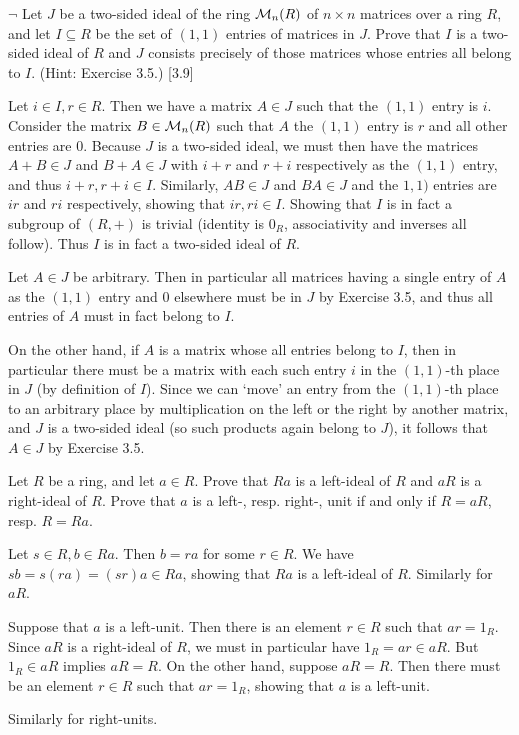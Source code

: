 \begin{problem}
	$\neg$ Let $J$ be a two-sided ideal of the ring $\mathcal{M}_n(R)$ of $n \times n$ matrices over a ring $R$, and let $I \subseteq R$ be the set of $(1, 1)$ entries of matrices in $J$. Prove that $I$ is a two-sided ideal of $R$ and $J$ consists precisely of those matrices whose entries all belong to $I$. (Hint: Exercise 3.5.) [3.9]
\end{problem}

\begin{solution}
	Let $i \in I, r \in R$. Then we have a matrix $A \in J$ such that the $(1,1)$ entry is $i$. Consider the matrix $B \in \mathcal{M}_n(R)$ such that $A$ the $(1,1)$ entry is $r$ and all other entries are $0$. Because $J$ is a two-sided ideal, we must then have the matrices $A + B \in J$ and $B + A \in J$ with $i + r$ and $r + i$ respectively as the $(1,1)$ entry, and thus $i+r, r+i \in I$. Similarly, $AB \in J$ and $BA \in J$ and the $1,1)$ entries are $ir$ and $ri$ respectively, showing that $ir, ri \in I$. Showing that $I$ is in fact a subgroup of $(R, +)$ is trivial (identity is $0_R$, associativity and inverses all follow). Thus $I$ is in fact a two-sided ideal of $R$.
	
	Let $A \in J$ be arbitrary. Then in particular all matrices having a single entry of $A$ as the $(1,1)$ entry and $0$ elsewhere must be in $J$ by Exercise 3.5, and thus all entries of $A$ must in fact belong to $I$.
	
	On the other hand, if $A$ is a matrix whose all entries belong to $I$, then in particular there must be a matrix with each such entry $i$ in the $(1,1)$-th place in $J$ (by definition of $I$). Since we can `move' an entry from the $(1,1)$-th place to an arbitrary place by multiplication on the left or the right by another matrix, and $J$ is a two-sided ideal (so such products again belong to $J$), it follows that $A \in J$ by Exercise 3.5.
\end{solution}

\begin{problem}
	Let $R$ be a ring, and let $a \in R$. Prove that $Ra$ is a left-ideal of $R$ and $aR$ is a right-ideal of $R$. Prove that $a$ is a left-, resp. right-, unit if and only if $R = aR$, resp. $R = Ra$.
\end{problem}

\begin{solution}
	Let $s \in R, b \in Ra$. Then $b = ra$ for some $r \in R$. We have $sb = s(ra) = (sr)a \in Ra$, showing that $Ra$ is a left-ideal of $R$. Similarly for $aR$.
	
	Suppose that $a$ is a left-unit. Then there is an element $r \in R$ such that $ar = 1_R$. Since $aR$ is a right-ideal of $R$, we must in particular have $1_R = ar \in aR$. But $1_R \in aR$ implies $aR = R$. On the other hand, suppose $aR = R$. Then there must be an element $r \in R$ such that $ar = 1_R$, showing that $a$ is a left-unit.
	
	Similarly for right-units.
\end{solution}

